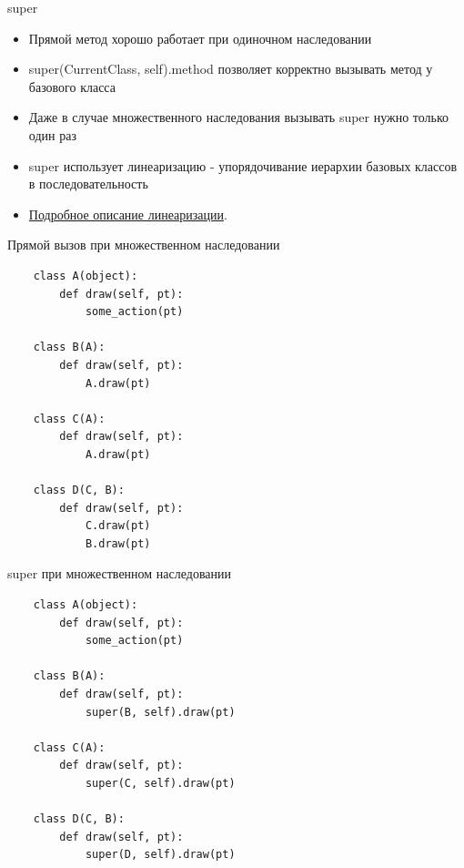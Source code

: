 \documentclass{article}
\begin{document}
\begin{center} super \end{center}
\begin{itemize}
    \item Прямой метод хорошо работает при одиночном наследовании
    \item super(CurrentClass, self).method позволяет корректно вызывать 
            метод у базового класса
    \item Даже в случае множественного наследования вызывать super нужно только один раз
    \item super использует линеаризацию - упорядочивание иерархии базовых классов в последовательность
    \item \href{http://www.python.org/download/releases/2.3/mro/}{Подробное описание линеаризации}.
\end{itemize}
\newpage

\begin{center} Прямой вызов при множественном наследовании \end{center}
\begin{lstlisting}
    class A(object):
        def draw(self, pt):
            some_action(pt)

    class B(A):
        def draw(self, pt):
            A.draw(pt)

    class C(A):
        def draw(self, pt):
            A.draw(pt)

    class D(C, B):
        def draw(self, pt):
            C.draw(pt)
            B.draw(pt)
\end{lstlisting}
\newpage

\begin{center} super при множественном наследовании \end{center}
\begin{lstlisting}
    class A(object):
        def draw(self, pt):
            some_action(pt)

    class B(A):
        def draw(self, pt):
            super(B, self).draw(pt)

    class C(A):
        def draw(self, pt):
            super(C, self).draw(pt)

    class D(C, B):
        def draw(self, pt):
            super(D, self).draw(pt)
\end{lstlisting}
\newpage
\end{document}
